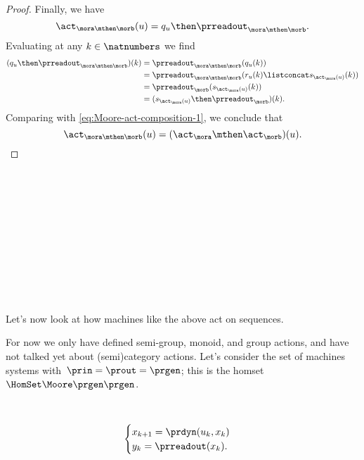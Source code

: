 \begin{proof}
    Finally, we have
    \begin{equation}
        \act_{\mora \mthen \morb}(u) = q_u \then \prreadout_{\mora \mthen \morb}.
    \end{equation}
    Evaluating at any $k \in \natnumbers$ we find
    \begin{align}
        (q_u \then \prreadout_{\mora \mthen \morb})(k) & = \prreadout_{\mora \mthen \morb}(q_u(k)) \\
                                                       & = \prreadout_{\mora \mthen \morb}(r_u(k) \listconcat s_{\act_\mora(u)}(k)) \\
                                                       & = \prreadout_{\morb}(s_{\act_\mora(u)}(k)) \\
                                                       & = (s_{\act_\mora(u)} \then \prreadout_{\morb})(k).
    \end{align}
    Comparing with \cref{eq:Moore-act-composition-1}, we conclude that
    \begin{equation}
        \act_{\mora \mthen \morb}(u) = (\act_\mora \mthen \act_\morb)(u).
    \end{equation}
\end{proof}

\

\

\


\

\

\


Let's now look at how machines like the above act on sequences.

For now we only have defined semi-group, monoid, and group actions, and have not talked yet about (semi)category actions.
Let's consider the set of machines systems with~$\prin = \prout = \prgen$; this is the homset~$\HomSet\Moore\prgen\prgen$.

\

\begin{equation}
    \begin{cases}
        x_{k+1} = \prdyn(u_k, x_k) \\
        y_{k}   = \prreadout(x_{k}).
    \end{cases}
\end{equation}

